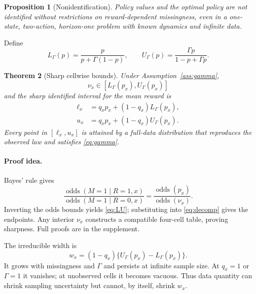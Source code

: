 \documentclass[letterpaper]{article}
\newtheorem{theorem}{Theorem}
\newtheorem{proposition}[theorem]{Proposition}
\theoremstyle{remark}
\newcommand{\odds}{\operatorname{odds}}
\begin{document}
\begin{proposition}[Nonidentification]\label{prop:nonid}
Policy values and the optimal policy are not identified without restrictions on reward-dependent missingness, even in a one-state, two-action, horizon-one problem with known dynamics and infinite data.
\end{proposition}

Define
\begin{equation}
L_\Gamma(p)=\frac{p}{p+\Gamma(1-p)},\qquad
U_\Gamma(p)=\frac{\Gamma p}{1-p+\Gamma p}. \label{eq:LU}
\end{equation}

\begin{theorem}[Sharp cellwise bounds]\label{thm:cell}
Under Assumption~\ref{ass:gamma},
\[
\nu_x\in[L_\Gamma(p_x),U_\Gamma(p_x)]
\]
and the sharp identified interval for the mean reward is
\begin{align}
\ell_x&=q_xp_x+(1-q_x)L_\Gamma(p_x),\label{eq:lower}\\
u_x&=q_xp_x+(1-q_x)U_\Gamma(p_x).\label{eq:upper}
\end{align}
Every point in $[\ell_x,u_x]$ is attained by a full-data distribution that reproduces the observed law and satisfies \eqref{eq:gamma}.
\end{theorem}

\paragraph{Proof idea.}
Bayes' rule gives
\[
\frac{\odds(M=1\mid R=1,x)}{\odds(M=1\mid R=0,x)}
=\frac{\odds(p_x)}{\odds(\nu_x)}.
\]
Inverting the odds bounds yields \eqref{eq:LU}; substituting into \eqref{eq:decomp} gives the endpoints. Any interior $\nu_x$ constructs a compatible four-cell table, proving sharpness. Full proofs are in the supplement.

The irreducible width is
\begin{equation}
w_x=(1-q_x)\{U_\Gamma(p_x)-L_\Gamma(p_x)\}. \label{eq:width}
\end{equation}
It grows with missingness and $\Gamma$ and persists at infinite sample size. At $q_x=1$ or $\Gamma=1$ it vanishes; at unobserved cells it becomes vacuous. Thus data quantity can shrink sampling uncertainty but cannot, by itself, shrink $w_x$.
\end{document}
